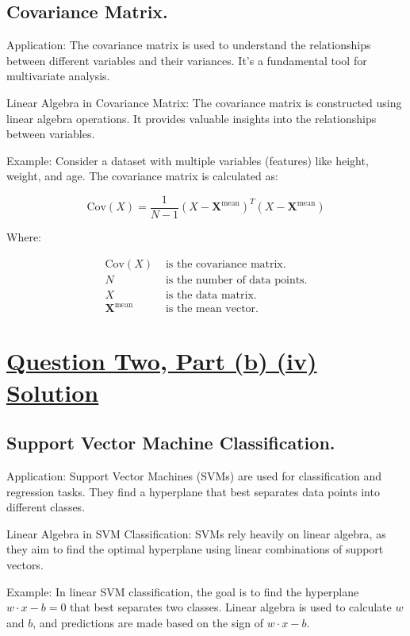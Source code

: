 \documentclass{article}
\begin{document}
\subsection*{Covariance Matrix.}
Application: The covariance matrix is used to understand the relationships between different variables and their variances. It's a fundamental tool for multivariate analysis.

Linear Algebra in Covariance Matrix: The covariance matrix is constructed using linear algebra operations. It provides valuable insights into the relationships between variables.

Example: Consider a dataset with multiple variables (features) like height, weight, and age. The covariance matrix is calculated as:

\[
\text{Cov}(X) = \frac{1}{N-1} (X - \mathbf{X}^{\text{mean}})^T (X - \mathbf{X}^{\text{mean}})
\]

Where:

\begin{align*}
\text{Cov}(X) & \text{ is the covariance matrix.} \\
N & \text{ is the number of data points.} \\
X & \text{ is the data matrix.} \\
\mathbf{X}^{\text{mean}} & \text{ is the mean vector.}
\end{align*}

\section*{\uline{\large Question Two, Part (b) (iv) Solution}}

\subsection*{Support Vector Machine Classification.}
Application: Support Vector Machines (SVMs) are used for classification and regression tasks. They find a hyperplane that best separates data points into different classes.

Linear Algebra in SVM Classification: SVMs rely heavily on linear algebra, as they aim to find the optimal hyperplane using linear combinations of support vectors.

Example: In linear SVM classification, the goal is to find the hyperplane $w \cdot x - b = 0$ that best separates two classes. Linear algebra is used to calculate $w$ and $b$, and predictions are made based on the sign of $w \cdot x - b$.
\end{document}

